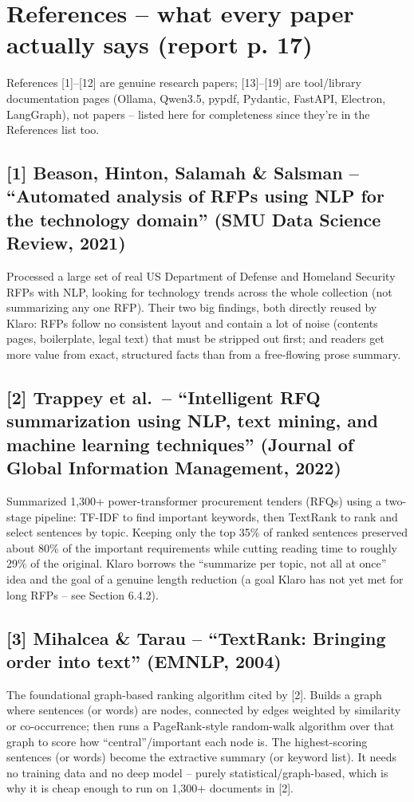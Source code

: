 \documentclass[11pt,a4paper]{article}
\begin{document}
\section{References -- what every paper actually says (report p. 17)}
\label{sec:refs}

\begin{bigpicture}
References [1]--[12] are genuine research papers; [13]--[19] are tool/library documentation pages
(Ollama, Qwen3.5, pypdf, Pydantic, FastAPI, Electron, LangGraph), not papers -- listed here for
completeness since they're in the References list too.
\end{bigpicture}

\subsection*{[1] Beason, Hinton, Salamah \& Salsman -- ``Automated analysis of RFPs using NLP for the
technology domain'' (SMU Data Science Review, 2021)}
Processed a large set of real US Department of Defense and Homeland Security RFPs with NLP, looking
for technology trends across the whole collection (not summarizing any one RFP). Their two big
findings, both directly reused by Klaro: RFPs follow no consistent layout and contain a lot of noise
(contents pages, boilerplate, legal text) that must be stripped out first; and readers get more value
from exact, structured facts than from a free-flowing prose summary.

\subsection*{[2] Trappey et al.\ -- ``Intelligent RFQ summarization using NLP, text mining, and
machine learning techniques'' (Journal of Global Information Management, 2022)}
Summarized 1{,}300+ power-transformer procurement tenders (RFQs) using a two-stage pipeline: TF-IDF
to find important keywords, then TextRank to rank and select sentences by topic. Keeping only the
top 35\% of ranked sentences preserved about 80\% of the important requirements while cutting reading
time to roughly 29\% of the original. Klaro borrows the ``summarize per topic, not all at once'' idea
and the goal of a genuine length reduction (a goal Klaro has not yet met for long RFPs -- see
Section 6.4.2).

\subsection*{[3] Mihalcea \& Tarau -- ``TextRank: Bringing order into text'' (EMNLP, 2004)}
\label{sec:textrank}
The foundational graph-based ranking algorithm cited by [2]. Builds a graph where sentences (or
words) are nodes, connected by edges weighted by similarity or co-occurrence; then runs a
PageRank-style random-walk algorithm over that graph to score how ``central''/important each node is.
The highest-scoring sentences (or words) become the extractive summary (or keyword list). It needs no
training data and no deep model -- purely statistical/graph-based, which is why it is cheap enough to
run on 1,300+ documents in [2].
\end{document}
